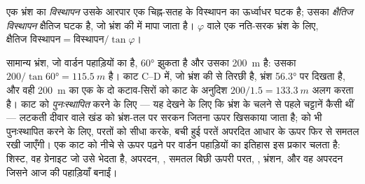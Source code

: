 \begin{definition}[भ्रंश का विस्थापन, क्षैतिज विस्थापन]\label{def:b1:cross-sections:throw}
एक भ्रंश का \emph{विस्थापन} उसके आरपार एक चिह्न-सतह के विस्थापन का ऊर्ध्वाधर घटक है;
उसका \emph{क्षैतिज विस्थापन} क्षैतिज घटक है, जो भ्रंश की  में मापा जाता है। 
$\varphi$ वाले एक नति-सरक भ्रंश के लिए,
$\text{क्षैतिज विस्थापन} = \text{विस्थापन}/\tan\varphi$।
\end{definition}

सामान्य भ्रंश, जो वार्डन पहाड़ियों का है, \ang{60} झुकता है और उसका  \qty{200}{m} है: उसका  $200/\tan\ang{60} = \qty{115.5}{m}$ है। काट C--D में, जो भ्रंश की  से तिरछी है, भ्रंश \ang{56.3} पर
दिखता है, और वही \qty{200}{m} का  एक  के दो कटाव-सिरों को काट के अनुदिश $200/1.5 = \qty{133.3}{m}$ अलग
करता है। काट को \emph{पुनःस्थापित} करने के लिए --- यह देखने के लिए कि भ्रंश के चलने से पहले चट्टानें कैसी थीं ---
लटकती दीवार वाले खंड को भ्रंश-तल पर सरकन जितना ऊपर खिसकाया जाता है;  को भी पुनःस्थापित करने के लिए, परतों
को सीधा करके, बची हुई परतें अपरदित आधार के ऊपर फिर से समतल रखी जाएँगी। एक काट को नीचे से ऊपर पढ़ने पर वार्डन
पहाड़ियों का इतिहास इस प्रकार चलता है: शिस्ट, वह ग्रेनाइट जो उसे भेदता है, अपरदन, , समतल बिछी
ऊपरी परत, , भ्रंशन, और वह अपरदन जिसने आज की पहाड़ियाँ बनाईं।

